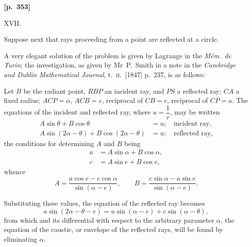 \documentclass[11pt]{article}
\begin{document}
\medskip
\noindent\textbf{[p.~353]}
\begin{center}XVII.\end{center}

Suppose next that rays proceeding from a point are reflected at a circle.

A very elegant solution of the problem is given by Lagrange in the \textit{M\'em.\ de Turin}; the investigation, as given by Mr~P.~Smith in a note in the \textit{Cambridge and Dublin Mathematical Journal}, t.~\textsc{ii}.\ [1847] p.~237, is as follows:

Let $B$ be the radiant point, $RBP$ an incident ray, and $PS$ a reflected ray; $CA$ a fixed radius; $ACP = \alpha$, $ACB = e$, reciprocal of $CB = c$, reciprocal of $CP = a$. The equations of the incident and reflected ray, where $u = \dfrac{1}{r}$, may be written
\begin{align*}
A\sin\theta + B\cos\theta &= u;\quad\text{incident ray,}\\
A\sin(2\alpha - \theta) + B\cos(2\alpha - \theta) &= u;\quad\text{reflected ray,}
\end{align*}
the conditions for determining $A$ and $B$ being
\begin{align*}
a &= A\sin\alpha + B\cos\alpha,\\
c &= A\sin e + B\cos e,
\end{align*}
whence
\[
A = \frac{a\cos e - c\cos\alpha}{\sin(\alpha - e)},\qquad B = \frac{c\sin\alpha - a\sin e}{\sin(\alpha - e)}.
\]

\begin{center}
\end{center}

\smallskip

Substituting these values, the equation of the reflected ray becomes
\[
a\sin(2\alpha - \theta - e) = u\sin(\alpha - e) + c\sin(\alpha - \theta),
\]
from which and its differential with respect to the arbitrary parameter $\alpha$, the equation of the caustic, or envelope of the reflected rays, will be found by eliminating $\alpha$.
\end{document}
